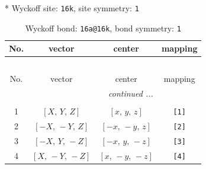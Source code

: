 \documentclass[fleqn,8pt]{jsarticle}
\begin{document}
* Wyckoff site: {\tt 16k}, site symmetry: {\tt 1}
\renewcommand{\arraystretch}{1.2}
\begin{longtable}{cccc}
\caption{Wyckoff bond: {\tt 16a@16k}, bond symmetry: {\tt 1}}
 \\
 \hline \hline
No. & vector & center & mapping \\ \hline \endfirsthead

\multicolumn{3}{l}{\tablename\ \thetable{}} \\
 \hline \hline
No. & vector & center & mapping \\ \hline \endhead

 \hline \hline
\multicolumn{3}{r}{\footnotesize\it continued ...} \\ \endfoot

 \hline \hline
\multicolumn{3}{r}{} \\ \endlastfoot

1 & $\left[ X,\, Y,\, Z \right]$ & $\left[ x,\, y,\, z \right]$ & {\tt [1]} \\ \hline
2 & $\left[ - X,\, - Y,\, Z \right]$ & $\left[ - x,\, - y,\, z \right]$ & {\tt [2]} \\ \hline
3 & $\left[ - X,\, Y,\, - Z \right]$ & $\left[ - x,\, y,\, - z \right]$ & {\tt [3]} \\ \hline
4 & $\left[ X,\, - Y,\, - Z \right]$ & $\left[ x,\, - y,\, - z \right]$ & {\tt [4]} \\
\end{longtable}
\end{document}
